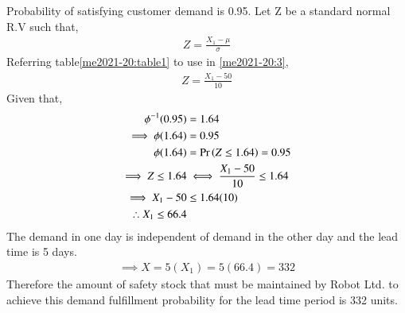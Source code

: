 
\begin{table}[htp]
\centering
\caption{Variables and their definitions}
\label{me2021-20:table1}
\end{table}
Probability of satisfying customer demand is 0.95.
Let Z be a standard normal R.V such that,
\begin{align}
    Z=\frac{X_1-\mu}{\sigma} \label{me2021-20:3}
\end{align}
Referring table\eqref{me2021-20:table1} to use in \eqref{me2021-20:3},
\begin{align}
    Z=\frac{X_1-50}{10}\label{me2021-20:4}
\end{align}
Given that,
\begin{align}
    \phi^{-1}(0.95)&=1.64\\
    \implies \phi(1.64)&=0.95\\
    \phi(1.64)&=\Pr\left(Z\le1.64\right)=0.95\\
    \implies Z\le1.64&\iff\frac{X_1-50}{10}\le1.64\\
    \implies X_1-50 &\le 1.64(10)\\
    \therefore X_1\le66.4
\end{align}
The demand in one day is independent of demand in the other day and the lead time is 5 days.
\begin{align}
    \implies X=5(X_1)=5(66.4)=332
\end{align}
Therefore the amount of safety
stock that must be maintained by Robot Ltd. to
achieve this demand fulfillment probability for
the lead time period is 332 units.